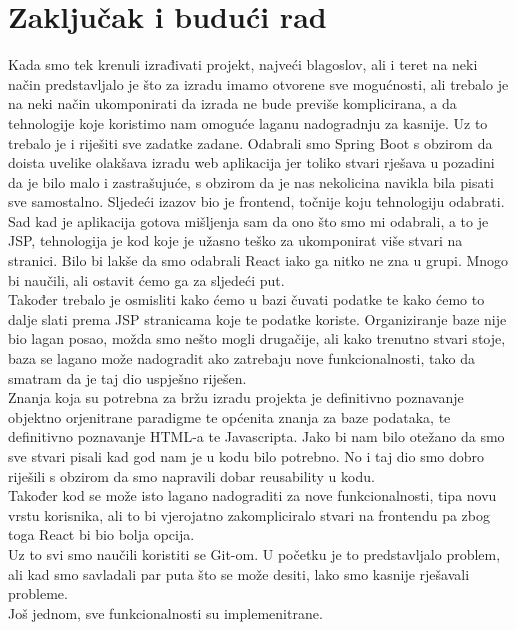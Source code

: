 \chapter{Zaključak i budući rad}
		\normalfont Kada smo tek krenuli izrađivati projekt, najveći blagoslov, ali i teret na neki način predstavljalo je što za izradu imamo otvorene sve mogućnosti, ali trebalo je na neki način ukomponirati da izrada ne bude previše komplicirana, a da tehnologije koje koristimo nam omoguće laganu nadogradnju za kasnije. Uz to trebalo je i riješiti sve zadatke zadane. Odabrali smo Spring Boot s obzirom da doista uvelike olakšava izradu web aplikacija jer toliko stvari rješava u pozadini da je bilo malo i zastrašujuće, s obzirom da je nas nekolicina navikla bila pisati sve samostalno. Sljedeći izazov bio je frontend, točnije koju tehnologiju odabrati. Sad kad je aplikacija gotova mišljenja sam da ono što smo mi odabrali, a to je JSP, tehnologija je kod koje je užasno teško za ukomponirat više stvari na stranici.  Bilo bi lakše da smo odabrali React iako ga nitko ne zna u grupi. Mnogo bi naučili, ali ostavit ćemo ga za sljedeći put.\\
		Također trebalo je osmisliti kako ćemo u bazi čuvati podatke te kako ćemo to dalje slati prema JSP stranicama koje te podatke koriste. Organiziranje baze nije bio lagan posao, možda smo nešto mogli drugačije, ali kako trenutno stvari stoje, baza se lagano može nadogradit ako zatrebaju nove funkcionalnosti, tako da smatram da je taj dio uspješno riješen.\\
		Znanja koja su potrebna za bržu izradu projekta je definitivno poznavanje objektno orjenitrane paradigme te općenita znanja za baze podataka, te definitivno poznavanje HTML-a te Javascripta. Jako bi nam bilo otežano da smo sve stvari pisali kad god nam je u kodu bilo potrebno.  No i taj dio smo dobro riješili s obzirom da smo napravili dobar reusability u kodu.\\
		Također kod se može isto lagano nadograditi za nove funkcionalnosti, tipa novu vrstu korisnika, ali to bi vjerojatno zakompliciralo stvari na frontendu pa zbog toga React bi bio bolja opcija.\\
		Uz to svi smo naučili koristiti se Git-om. U početku je to predstavljalo problem, ali kad smo savladali par puta što se može desiti, lako smo kasnije rješavali probleme.\\
		Još jednom, sve funkcionalnosti su implemenitrane.
		
		
		\eject 
